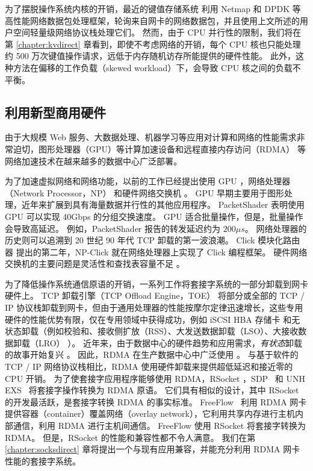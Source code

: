 为了摆脱操作系统内核的开销，最近的键值存储系统  \cite {kapoor2012chronos,ousterhout2010case,ousterhout2015ramcloud,lim2014mica,li2016full} 利用 Netmap \cite {rizzo2012netmap} 和 DPDK \cite{intel2014data} 等高性能网络数据包处理框架，轮询来自网卡的网络数据包，并且使用上文所述的用户空间轻量级网络协议栈处理它们。
然而，由于 CPU 并行性的限制，我们将在第 \ref{chapter:kvdirect} 章看到，即使不考虑网络的开销，每个 CPU 核也只能处理约 500 万次键值操作请求，远低于内存随机访存所能提供的硬件性能。
此外，这种方法在偏移的工作负载（skewed workload）下，会导致 CPU 核之间的负载不平衡。





\subsection{利用新型商用硬件}


由于大规模 Web 服务、大数据处理、机器学习等应用对计算和网络的性能需求非常迫切，图形处理器（GPU）等计算加速设备和远程直接内存访问（RDMA） \cite{infiniband2000infiniband} 等网络加速技术在越来越多的数据中心广泛部署。

为了加速虚拟网络和网络功能，以前的工作已经提出使用 GPU \cite {packetshader}，网络处理器（Network Processor，NP） \cite {cavium,netronome} 和硬件网络交换机 \cite {duet}。
GPU 早期主要用于图形处理，近年来扩展到具有海量数据并行性的其他应用程序。
PacketShader \cite {packetshader} 表明使用 GPU 可以实现 40Gbps 的分组交换速度。
GPU 适合批量操作，但是，批量操作会导致高延迟。
例如，PacketShader \cite {packetshader} 报告的转发延迟约为 $200 \mu{}s$。
网络处理器的历史则可以追溯到 20 世纪 90 年代 TCP 卸载的第一波浪潮。
Click 模块化路由器 \cite{kohler2000click} 提出的第二年，NP-Click \cite{shah2004np} 就在网络处理器上实现了 Click 编程框架。
硬件网络交换机的主要问题是灵活性和查找表容量不足 \cite {duet}。

为了降低操作系统通信原语的开销，一系列工作将套接字系统的一部分卸载到网卡硬件上。
TCP 卸载引擎（TCP Offload Engine，TOE） \cite {tcp-chimney-offload} 将部分或全部的 TCP / IP 协议栈卸载到网卡，但由于通用处理器的性能按摩尔定律迅速增长，这些专用硬件的性能优势有限，仅在专用领域中获得成功，例如 iSCSI HBA 存储卡 \cite {iscsi-hba} 和无状态卸载（例如校验和、接收侧扩放（RSS）、大发送数据卸载（LSO）、大接收数据卸载（LRO） \cite {lsolro}）。
近年来，由于数据中心的硬件趋势和应用需求，\emph {有状态}卸载的故事开始复兴 \cite {chuanxiong-rdma-keynote}。
因此，RDMA \cite {infiniband2000infiniband} 在生产数据中心中广泛使用 \cite {guo2016rdma}。
与基于软件的 TCP / IP 网络协议栈相比，RDMA 使用硬件卸载来提供超低延迟和接近零的 CPU 开销。
为了使套接字应用程序能够使用 RDMA，RSocket \cite {rsockets}，SDP~ \cite {socketsdirect} 和 UNH EXS~ \cite {russell2008extended} 将套接字操作转换为 RDMA 原语。
它们具有相似的设计，其中 RSocket 的开发最活跃，是套接字转换 RDMA 的事实标准。
FreeFlow~ \cite {nsdi19freeflow} 利用 RDMA 网卡提供容器（container）覆盖网络（overlay network），它利用共享内存进行主机内部通信，利用 RDMA 进行主机间通信。
FreeFlow 使用 RSocket 将套接字转换为 RDMA。
但是，RSocket 的性能和兼容性都不令人满意。
我们在第 \ref{chapter:socksdirect} 章将提出一个与现有应用兼容，并能充分利用 RDMA 网卡性能的套接字系统。

